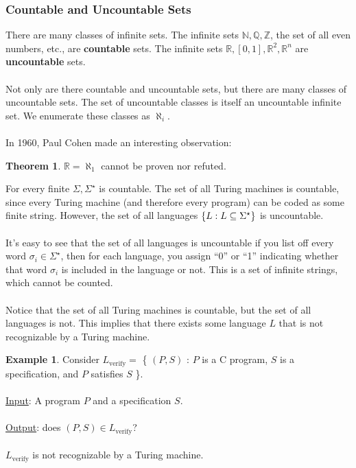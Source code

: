 \documentclass[]{article}
\DeclarePairedDelimiter{\set}{\lbrace}{\rbrace}
\theoremstyle{definition}
\newtheorem*{theorem}{Theorem}
\newtheorem{ex}{Example}[section]
\begin{document}
    \subsubsection{Countable and Uncountable Sets}
      There are many classes of infinite sets. The infinite sets $\mathbb{N}, \mathbb{Q}, \mathbb{Z}$, the set of all even numbers, etc., are \textbf{countable} sets. The infinite sets $\mathbb{R}, [0, 1], \mathbb{R}^2, \mathbb{R}^n$ are \textbf{uncountable} sets.
      \\ \\
      Not only are there countable and uncountable sets, but there are many classes of uncountable sets. The set of uncountable classes is itself an uncountable infinite set. We enumerate these classes as $\aleph_i$.
      \\ \\
      In 1960, Paul Cohen made an interesting observation:
      \begin{theorem}
        $\mathbb{R} = \aleph_1$ cannot be proven nor refuted.
      \end{theorem}

      For every finite $\Sigma, \Sigma^\star$ is countable. The set of all Turing machines is countable, since every Turing machine (and therefore every program) can be coded as some finite string. However, the set of all languages $\set{L : L \subseteq \Sigma^\star }$ is uncountable.
      \\ \\
      It's easy to see that the set of all languages is uncountable if you list off every word $\sigma_i \in \Sigma^\star$, then for each language, you assign ``0'' or ``1'' indicating whether that word $\sigma_i$ is included in the language or not. This is a set of infinite strings, which cannot be counted.
      \\ \\
      Notice that the set of all Turing machines is countable, but the set of all languages is not. This implies that there exists some language $L$ that is not recognizable by a Turing machine.
      \begin{ex}
        Consider $L_\text{verify} = $ \{ $(P, S)$ : $P$ is a C program, $S$ is a specification, and $P$ satisfies $S$ \}.
        \\ \\
        \underline{Input}: A program $P$ and a specification $S$.
        \\ \\
        \underline{Output}: does $(P, S) \in L_\text{verify}$?
        \\ \\
        $L_\text{verify}$ is not recognizable by a Turing machine.
      \end{ex}
\end{document}
